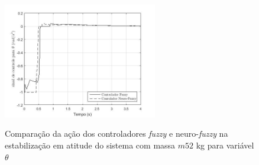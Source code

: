 \begin{figure}[!htb]
    \centering
    \caption{Comparação da ação dos controladores \textit{fuzzy} e neuro-\textit{fuzzy} na estabilização em atitude do sistema com massa $m52$ kg para variável $\theta$}
    \includegraphics[width=0.6\textwidth]{./04-figuras/figuras_pos_banca/4-atitude5kg/fig_contoller_theta_5kg}
    \label{fig:fig_contoller_theta_5kg}
\end{figure}





